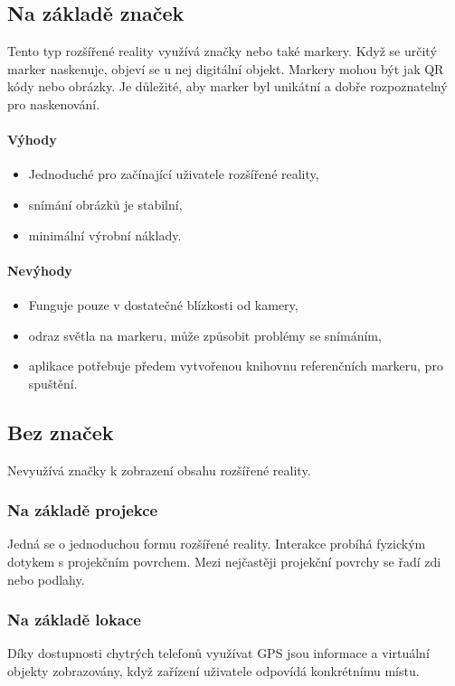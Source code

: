 \documentclass[12pt, a4paper,
twoside,        %
openright
]{report}
\begin{document}
\subsection{Na základě značek}
Tento typ rozšířené reality využívá značky nebo také markery. Když se určitý marker naskenuje,
objeví se u nej digitální objekt. Markery mohou být jak QR kódy nebo obrázky. Je důležité, aby
marker byl unikátní a dobře rozpoznatelný pro naskenování. 

\paragraph{Výhody}
\begin{itemize}
	\item Jednoduché pro začínající uživatele rozšířené reality,
	\item snímání obrázků je stabilní,
	\item minimální výrobní náklady.
\end{itemize}

\paragraph{Nevýhody}
\begin{itemize}
	\item Funguje pouze v dostatečné blízkosti od kamery,
	\item odraz světla na markeru, může způsobit problémy se snímáním,
	\item aplikace potřebuje předem vytvořenou knihovnu referenčních markeru, pro spuštění.
\end{itemize}

\subsection{Bez značek}
Nevyužívá značky k zobrazení obsahu rozšířené reality.

\subsubsection{Na základě projekce}
Jedná se o jednoduchou formu rozšířené reality. Interakce probíhá fyzickým dotykem s projekčním povrchem. Mezi nejčastěji projekční povrchy se řadí zdi nebo podlahy.

\subsubsection{Na základě lokace}
Díky dostupnosti chytrých telefonů využívat GPS jsou informace a virtuální objekty zobrazovány, když zařízení uživatele odpovídá konkrétnímu místu. 
\end{document}
